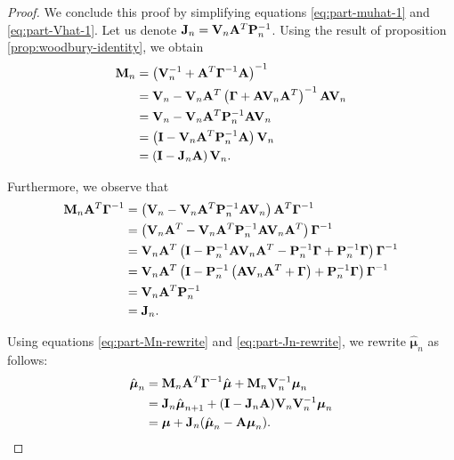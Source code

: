 \documentclass[11pt]{article}
\numberwithin{equation}{section}
\begin{document}
\begin{proof}
	We conclude this proof by simplifying equations \eqref{eq:part-muhat-1} and \eqref{eq:part-Vhat-1}.  Let us denote ${\bf J}_n = {\bf V}_n{\bf A}^T{\bf P}_n^{-1}$. Using the result of proposition \ref{prop:woodbury-identity}, we obtain
	\begin{align}
		{\bf M}_n 
			&= \left({\bf V}_n^{-1} + {\bf A}^T \boldsymbol\Gamma^{-1} {\bf A}\right)^{-1}\\
			&= {\bf V}_n - {\bf V}_n{\bf A}^T\left(\boldsymbol\Gamma + {\bf A}{\bf V}_n {\bf A}^T\right)^{-1}{\bf A}{\bf V}_n\\
			&= {\bf V}_n - {\bf V}_n{\bf A}^T{\bf P}_n^{-1}{\bf A}{\bf V}_n\\
			&= \left({\bf I} - {\bf V}_n{\bf A}^T{\bf P}_n^{-1}{\bf A}\right){\bf V}_n\\
			&= \left({\bf I} - {\bf J}_n{\bf A}\right){\bf V}_n. \label{eq:part-Mn-rewrite}
	\end{align}
	
	Furthermore, we observe that
	\begin{align}
		{\bf M}_n {\bf A}^T \boldsymbol{\Gamma}^{-1}
		&= \left({\bf V}_n - {\bf V}_n{\bf A}^T{\bf P}_n^{-1}{\bf A}{\bf V}_n\right){\bf A}^T\boldsymbol\Gamma^{-1}\\
		&= \left({\bf V}_n{\bf A}^T - {\bf V}_n{\bf A}^T{\bf P}_n^{-1}{\bf A}{\bf V}_n{\bf A}^T\right)\boldsymbol\Gamma^{-1}\\
		&= {\bf V}_n{\bf A}^T\left({\bf I} - {\bf P}_n^{-1}{\bf A}{\bf V}_n{\bf A}^T - {\bf P}_n^{-1}\boldsymbol{\Gamma} + {\bf P}_n^{-1}\boldsymbol{\Gamma}\right)\boldsymbol\Gamma^{-1}\\
		&= {\bf V}_n{\bf A}^T\left({\bf I} - {\bf P}_n^{-1}\left({\bf A}{\bf V}_n{\bf A}^T + \boldsymbol\Gamma\right) + {\bf P}_n^{-1}\boldsymbol{\Gamma}\right)\boldsymbol\Gamma^{-1}\\
		&= {\bf V}_n{\bf A}^T {\bf P}_n^{-1}\\
		&= {\bf J}_n. \label{eq:part-Jn-rewrite}
	\end{align}

	Using equations \eqref{eq:part-Mn-rewrite} and \eqref{eq:part-Jn-rewrite}, we rewrite $\hat{\boldsymbol{\mu}}_n$ as follows:
	\begin{align}
		\hat{\boldsymbol{\mu}}_n 
		&= {\bf M}_n {\bf A}^T \boldsymbol\Gamma ^{-1} \hat{\boldsymbol{\mu}} + {\bf M}_n {\bf V}_n^{-1} \boldsymbol\mu_n\\
		&= {\bf J}_n \hat{\boldsymbol{\mu}}_{n+1} + ({\bf I} - {\bf J}_n {\bf A}){\bf V}_n{\bf V}_n^{-1}\boldsymbol{\mu}_n\\
		&= \boldsymbol{\mu} + {\bf J}_n(\hat{\boldsymbol{\mu}}_n - {\bf A}\boldsymbol\mu_n).
	\end{align}
	

\end{proof}
\end{document}
